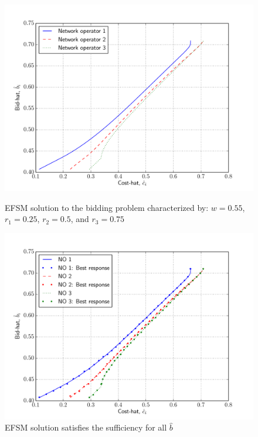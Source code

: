 \begin{figure}[p!]
  \includegraphics[width=\figsize]{Indirect/Figures/efs_3}
  \caption{EFSM solution to the bidding problem characterized by: $w=0.55$, $r_1 = 0.25$, $r_2 = 0.5$, and $r_3 = 0.75$}
  \label{fig:efs_3_indirect}
  \vspace{10mm}
  \includegraphics[width=\figsize]{Indirect/Figures/efs_3_sufficiency}
  \caption{EFSM solution satisfies the sufficiency for all $\hat{b}$}
  \label{fig:efs_3_sufficiency_indirect}
\end{figure}

